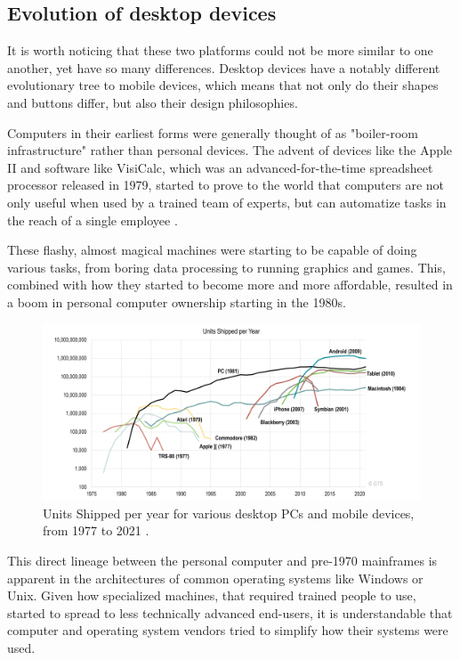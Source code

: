 \subsection{Evolution of desktop devices}

It is worth noticing that these two platforms could not be more similar to one another, yet have so many differences. Desktop devices have a notably different evolutionary tree to mobile devices, which means that not only do their shapes and buttons differ, but also their design philosophies.

Computers in their earliest forms were generally thought of as "boiler-room infrastructure" rather than personal devices. The advent of devices like the Apple II and software like VisiCalc, which was an advanced-for-the-time spreadsheet processor released in 1979, started to prove to the world that computers are not only useful when used by a trained team of experts, but can automatize tasks in the reach of a single employee \cite{NYBirthPC}.

These flashy, almost magical machines were starting to be capable of doing various tasks, from boring data processing to running graphics and games. This, combined with how they started to become more and more affordable, resulted in a boom in personal computer ownership starting in the 1980s.

\begin{figure}[htbp]
    \centering
    \includegraphics[width=\textwidth]{./figures/historical_pc_usage.png}
    \caption{Units Shipped per year for various desktop PCs and mobile devices, from 1977 to 2021 \cite{TGPCHis}.}
    \label{FigHistoricalPC}
\end{figure}

This direct lineage between the personal computer and pre-1970 mainframes is apparent in the architectures of common operating systems like Windows or Unix. Given how specialized machines, that required trained people to use, started to spread to less technically advanced end-users, it is understandable that computer and operating system vendors tried to simplify how their systems were used.

